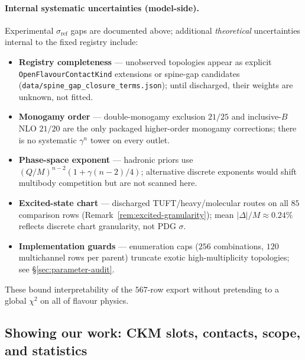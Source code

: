\documentclass[11pt]{amsart}
\begin{document}
\paragraph{Internal systematic uncertainties (model-side).}
Experimental $\sigma_{\mathrm{ref}}$ gaps are documented above; additional
\emph{theoretical} uncertainties internal to the fixed registry include:
\begin{itemize}[leftmargin=2em]
\item \textbf{Registry completeness} --- unobserved topologies appear as explicit
  \texttt{OpenFlavourContactKind} extensions or spine-gap candidates
  (\texttt{data/spine\_gap\_closure\_terms.json}); until discharged, their weights
  are unknown, not fitted.
\item \textbf{Monogamy order} --- double-monogamy exclusion $21/25$ and inclusive-$B$
  NLO $21/20$ are the only packaged higher-order monogamy corrections; there is
  no systematic $\gamma^n$ tower on every outlet.
\item \textbf{Phase-space exponent} --- hadronic priors use
  $(Q/M)^{n-2}(1+\gamma(n-2)/4)$; alternative discrete exponents would shift
  multibody competition but are not scanned here.
\item \textbf{Excited-state chart} --- discharged TUFT/heavy/molecular routes on all
  $85$ comparison rows (Remark~\ref{rem:excited-granularity}); mean $|\Delta|/M
  \approx 0.24\%$ reflects discrete chart granularity, not PDG $\sigma$.
\item \textbf{Implementation guards} --- enumeration caps ($256$ combinations,
  $120$ multichannel rows per parent) truncate exotic high-multiplicity topologies;
  see \S\ref{sec:parameter-audit}.
\end{itemize}
These bound interpretability of the $567$-row export without pretending to a global
$\chi^2$ on all of flavour physics.

\subsection{Showing our work: CKM slots, contacts, scope, and statistics}
\label{sec:referee-audit}
\end{document}

